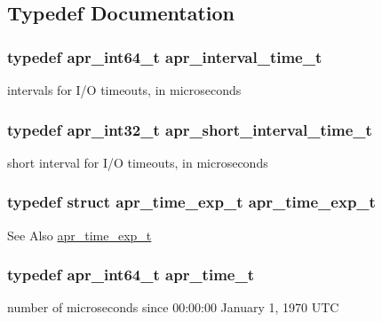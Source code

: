 \subsection{Typedef Documentation}
\hypertarget{group__apr__time_gaae2129185a395cc393f76fabf4f43e47}{
\subsubsection[{apr\-\_\-interval\-\_\-time\-\_\-t}]{\setlength{\rightskip}{0pt plus 5cm}typedef apr\-\_\-int64\-\_\-t {\bf apr\-\_\-interval\-\_\-time\-\_\-t}}}\label{group__apr__time_gaae2129185a395cc393f76fabf4f43e47}
intervals for I/\-O timeouts, in microseconds \hypertarget{group__apr__time_ga3e4663cc0d8b730902ff697c8d3f64be}{
\subsubsection[{apr\-\_\-short\-\_\-interval\-\_\-time\-\_\-t}]{\setlength{\rightskip}{0pt plus 5cm}typedef apr\-\_\-int32\-\_\-t {\bf apr\-\_\-short\-\_\-interval\-\_\-time\-\_\-t}}}\label{group__apr__time_ga3e4663cc0d8b730902ff697c8d3f64be}
short interval for I/\-O timeouts, in microseconds \hypertarget{group__apr__time_gae28f2767111a534f263ced95a28489b1}{
\subsubsection[{apr\-\_\-time\-\_\-exp\-\_\-t}]{\setlength{\rightskip}{0pt plus 5cm}typedef struct {\bf apr\-\_\-time\-\_\-exp\-\_\-t} {\bf apr\-\_\-time\-\_\-exp\-\_\-t}}}\label{group__apr__time_gae28f2767111a534f263ced95a28489b1}
\begin{DoxySeeAlso}{See Also}
\hyperlink{structapr__time__exp__t}{apr\-\_\-time\-\_\-exp\-\_\-t} 
\end{DoxySeeAlso}
\hypertarget{group__apr__time_gadb4bde16055748190eae190c55aa02bb}{
\subsubsection[{apr\-\_\-time\-\_\-t}]{\setlength{\rightskip}{0pt plus 5cm}typedef apr\-\_\-int64\-\_\-t {\bf apr\-\_\-time\-\_\-t}}}\label{group__apr__time_gadb4bde16055748190eae190c55aa02bb}
number of microseconds since 00\-:00\-:00 January 1, 1970 U\-T\-C 

